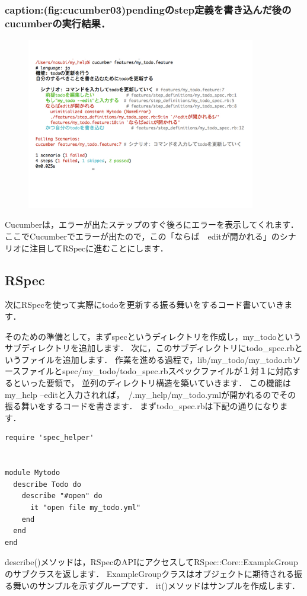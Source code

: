 \subsubsection{caption:(fig:cucumber03)pendingのstep定義を書き込んだ後のcucumberの実行結果．}
\begin{figure}[htbp]\begin{center}
\includegraphics[width=10cm,bb= 0 0 737 553]{../figs/./cucumber03.001.jpg}
\caption{}
\label{default}\end{center}\end{figure}
Cucumberは，エラーが出たステップのすぐ後ろにエラーを表示してくれます．
ここでCucumberでエラーが出たので，この「ならば　editが開かれる」のシナリオに注目してRSpecに進むことにします．

\subsection{RSpec}
次にRSpecを使って実際にtodoを更新する振る舞いをするコード書いていきます．

そのための準備として，まずspecというディレクトリを作成し，my\_todoというサブディレクトリを追加します．
次に，このサブディレクトリにtodo\_spec.rbというファイルを追加します．
作業を進める過程で，lib/my\_todo/my\_todo.rbソースファイルとspec/my\_todo/todo\_spec.rbスペックファイルが１対１に対応するといった要領で，
並列のディレクトリ構造を築いていきます．
この機能はmy\_help --editと入力されれば，~/.my\_help/my\_todo.ymlが開かれるのでその振る舞いをするコードを書きます．
まずtodo\_spec.rbは下記の通りになります．
\begin{lstlisting}[style=customRuby]
require 'spec_helper'


module Mytodo
  describe Todo do
    describe "#open" do
      it "open file my_todo.yml" 
    end
  end
end

\end{lstlisting}
describe()メソッドは，RSpecのAPIにアクセスしてRSpec::Core::ExampleGroupのサブクラスを返します．
ExampleGroupクラスはオブジェクトに期待される振る舞いのサンプルを示すグループです．
it()メソッドはサンプルを作成します．

